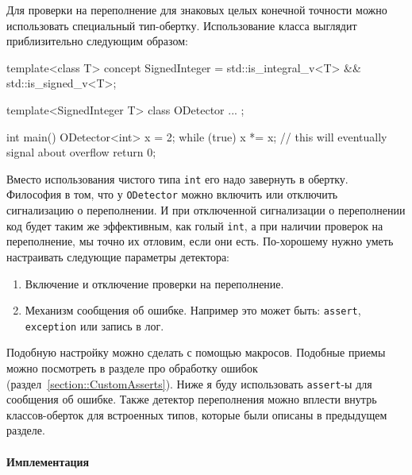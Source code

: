 Для проверки на переполнение для знаковых целых конечной точности можно использовать специальный тип-обертку.
Использование класса выглядит приблизительно следующим образом:
\begin{cppcode}
template<class T>
concept SignedInteger = std::is_integral_v<T> && std::is_signed_v<T>;

template<SignedInteger T>
class ODetector { ... };

int main() {
   ODetector<int> x = 2;
   while (true) {
     x *= x; // this will eventually signal about overflow
   }
   return 0;
}
\end{cppcode}
Вместо использования чистого типа \verb"int" его надо завернуть в обертку.
Философия в том, что у \verb"ODetector" можно включить или отключить сигнализацию о переполнении.
И при отключенной сигнализации о переполнении код будет таким же эффективным, как голый \verb"int", а при наличии проверок на переполнение, мы точно их отловим, если они есть.
По-хорошему нужно уметь настраивать следующие параметры детектора:
\begin{enumerate}
\item Включение и отключение проверки на переполнение.

\item Механизм сообщения об ошибке.
Например это может быть: \verb"assert", \verb"exception" или запись в лог.
\end{enumerate}
Подобную настройку можно сделать с помощью макросов.
Подобные приемы можно посмотреть в разделе про обработку ошибок (раздел~\ref{section::CustomAsserts}).
Ниже я буду использовать \verb"assert"-ы для сообщения об ошибке.
Также детектор переполнения можно вплести внутрь классов-оберток для встроенных типов, которые были описаны в предыдущем разделе.

\paragraph{Имплементация}

